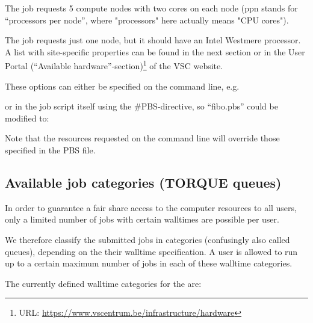 The job requests 5 compute nodes with two cores on each node (ppn stands for
``processors per node'', where "processors" here actually means "CPU cores"). \\

\begin{prompt}
\end{prompt}

The job requests just one node, but it should have an Intel Westmere processor.
A list with site-specific properties can be found in the next section or in the
User Portal
(``Available hardware''-section)\footnote{URL: \url{https://www.vscentrum.be/infrastructure/hardware}}
of the VSC website.

These options can either be specified on the command line, e.g.

\begin{prompt}
\end{prompt}

or in the job script itself using the \#PBS-directive, so ``fibo.pbs'' could be modified to:


Note that the resources requested on the command line will override those
specified in the PBS file.

\subsection{Available job categories (TORQUE queues)}

In order to guarantee a fair share access to the computer resources to all
users, only a limited number of jobs with certain walltimes are possible per
user.

We therefore classify the submitted jobs in categories (confusingly also called
queues), depending on the their walltime specification.  A user is allowed to
run up to a certain maximum number of jobs in each of these walltime
categories.

The currently defined walltime categories for the \hpc
are:



